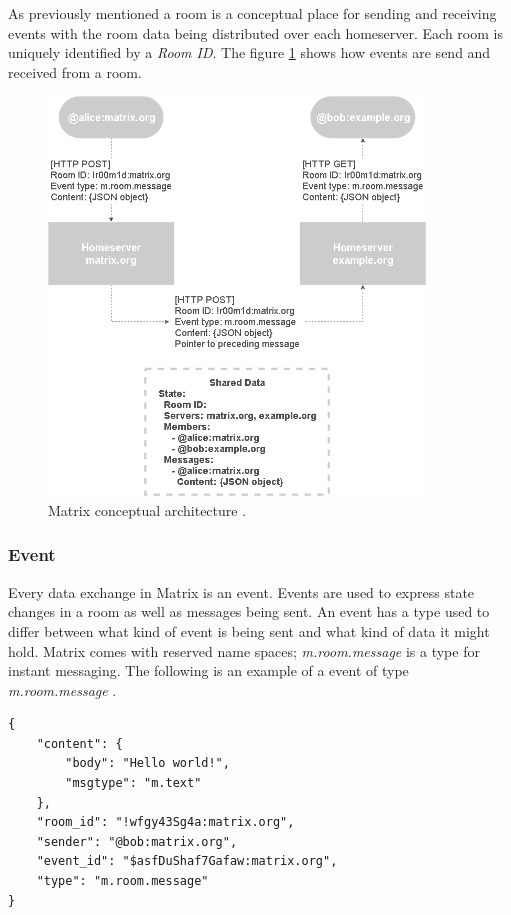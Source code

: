 As previously mentioned a room is a conceptual place for sending and receiving events with the room data being distributed over each homeserver. Each room is uniquely identified by a \emph{Room ID}. The figure \ref{fig:matrix_room} shows how events are send and received from a room.



\begin{figure}[H]
	\centering
	\includegraphics[width=10cm]{figures/matrix_room.png}
	\caption{ Matrix conceptual architecture \cite{matrixspec}.}
	\label{fig:matrix_room}
\end{figure}

\subsubsection{Event}

Every data exchange in Matrix is an event. Events are used to express state changes in a room as well as messages being sent. An event has a type used to differ between what kind of event is being sent and what kind of data it might hold. Matrix comes with reserved name spaces; \emph{m.room.message} is a type for instant messaging. The following is an example of a event of type \emph{m.room.message} \cite{matrixspec}.


\begin{lstlisting}[style=json]
{
	"content": {
		"body": "Hello world!",
		"msgtype": "m.text"
	},
	"room_id": "!wfgy43Sg4a:matrix.org",
	"sender": "@bob:matrix.org",
	"event_id": "$asfDuShaf7Gafaw:matrix.org",
	"type": "m.room.message"
}
\end{lstlisting}

